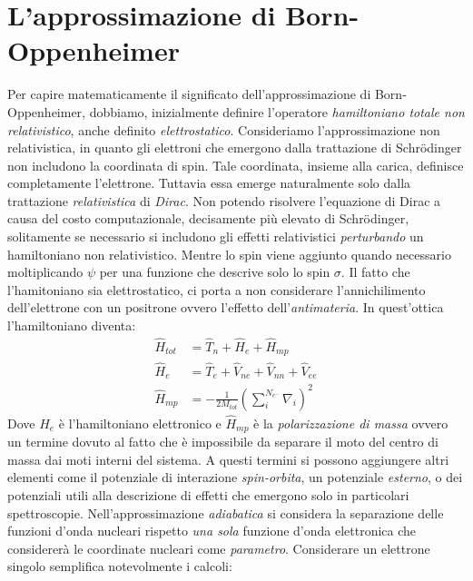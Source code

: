 \documentclass[oneside]{amsbook}
\numberwithin{section}{chapter}
\numberwithin{equation}{section}
\numberwithin{figure}{section}
\begin{document}
\section{L'approssimazione di Born-Oppenheimer}
Per capire matematicamente il significato dell'approssimazione di Born- Oppenheimer,  dobbiamo, inizialmente definire l'operatore \emph{hamiltoniano totale non relativistico}, anche definito \emph{elettrostatico}. Consideriamo l'approssimazione non relativistica, in quanto gli elettroni che emergono dalla trattazione di Schr\"odinger non includono la coordinata di spin. Tale coordinata, insieme alla carica, definisce completamente l'elettrone. Tuttavia essa emerge naturalmente solo dalla trattazione \emph{relativistica }di \emph{Dirac}.
Non potendo risolvere l'equazione di Dirac a causa del costo computazionale, decisamente più elevato di Schr\"odinger, solitamente se necessario si includono gli effetti relativistici \emph{perturbando} un hamiltoniano non relativistico. Mentre lo spin viene aggiunto quando necessario moltiplicando $\psi$ per una funzione che descrive solo lo spin $\sigma$. Il fatto che l'hamitoniano sia elettrostatico, ci porta a non considerare l'annichilimento dell'elettrone con un positrone ovvero l'effetto dell'\emph{antimateria}.
In quest'ottica l'hamiltoniano diventa:
\begin{equation}
\begin{aligned}
\hat{H}_{tot}&=\hat{T}_n + \hat{H}_e +\hat{H}_{mp} \\
 \hat{H}_e &=\hat{T}_e + \hat{V}_{ne} +\hat{V}_{nn}+\hat{V}_{ee} \\ 
\hat{H}_{mp}&=-\frac{1}{2M_{tot}}\left(\sum \limits _{i} ^{N_{e^-}}\nabla _i \right)^2	 
\end{aligned}
\end{equation}
Dove $\hat{H}_{e}$ è l'hamiltoniano elettronico e $\hat{H}_{mp}$ è la \emph{polarizzazione di massa} ovvero un termine dovuto al fatto che è impossibile da separare il moto del centro di massa dai moti interni del sistema.
A questi termini si possono aggiungere altri elementi come il potenziale di interazione \emph{spin-orbita}, un potenziale \emph{esterno}, o dei potenziali utili alla descrizione di effetti che emergono solo in particolari spettroscopie.
Nell'approssimazione \emph{adiabatica} si considera la separazione delle funzioni d'onda nucleari rispetto \emph{una sola} funzione d'onda elettronica che considererà le coordinate nucleari come \emph{parametro}. Considerare un elettrone singolo semplifica notevolmente i calcoli:
\end{document}
